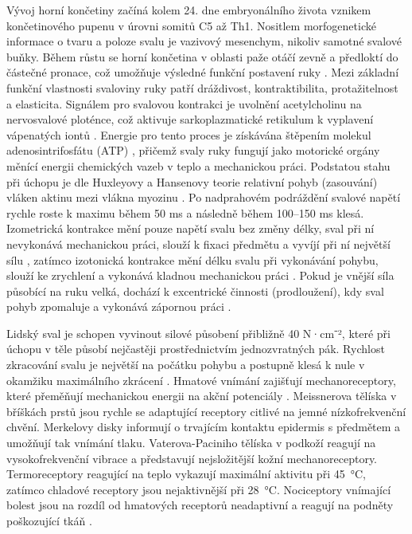 \documentclass[FZS,DP]{tulthesis}
\begin{document}
Vývoj horní končetiny začíná kolem 24. dne embryonálního života vznikem končetinového pupenu v úrovni somitů C5 až Th1. Nositlem morfogenetické informace o tvaru a poloze svalu je vazivový mesenchym, nikoliv samotné svalové buňky. Během růstu se horní končetina v oblasti paže otáčí zevně a předloktí do částečné pronace, což umožňuje výsledné funkční postavení ruky \cite{Cihak2011}. Mezi základní funkční vlastnosti svaloviny ruky patří dráždivost, kontraktibilita, protažitelnost a elasticita. Signálem pro svalovou kontrakci je uvolnění acetylcholinu na nervosvalové ploténce, což aktivuje sarkoplazmatické retikulum k vyplavení vápenatých iontů \cite{Stuchla2024}. Energie pro tento proces je získávána štěpením molekul adenosintrifosfátu (ATP) \cite{Cihak2011}, přičemž svaly ruky fungují jako motorické orgány měnící energii chemických vazeb v teplo a mechanickou práci. Podstatou stahu při úchopu je dle Huxleyovy a Hansenovy teorie relativní pohyb (zasouvání) vláken aktinu mezi vlákna myozinu \cite{Benes2022}.
Po nadprahovém podráždění svalové napětí rychle roste k maximu během 50 ms a následně během 100–150 ms klesá. Izometrická kontrakce mění pouze napětí svalu bez změny délky, sval při ní nevykonává mechanickou práci, slouží k fixaci předmětu a vyvíjí při ní největší sílu \cite{Benes2022}, zatímco izotonická kontrakce mění délku svalu při vykonávání pohybu, slouží ke zrychlení a vykonává kladnou mechanickou práci \cite{Benes2022, Stuchla2024}. Pokud je vnější síla působící na ruku velká, dochází k excentrické činnosti (prodloužení), kdy sval pohyb zpomaluje a vykonává zápornou práci \cite{Benes2022}.

Lidský sval je schopen vyvinout silové působení přibližně 40 N·cm⁻², které při úchopu v těle působí nejčastěji prostřednictvím jednozvratných pák. Rychlost zkracování svalu je největší na počátku pohybu a postupně klesá k nule v okamžiku maximálního zkrácení \cite{Benes2022}. Hmatové vnímání zajišťují mechanoreceptory, které přeměňují mechanickou energii na akční potenciály \cite{Cihak2016}. Meissnerova tělíska v bříškách prstů jsou rychle se adaptující receptory citlivé na jemné nízkofrekvenční chvění. Merkelovy disky informují o trvajícím kontaktu epidermis s předmětem a umožňují tak vnímání tlaku. Vaterova-Paciniho tělíska v podkoží reagují na vysokofrekvenční vibrace a představují nejsložitější kožní mechanoreceptory. Termoreceptory reagující na teplo vykazují maximální aktivitu při 45~°C, zatímco chladové receptory jsou nejaktivnější při 28~°C. Nociceptory vnímající bolest jsou na rozdíl od hmatových receptorů neadaptivní a reagují na podněty poškozující tkáň \cite{Stuchla2024}.
\end{document}
